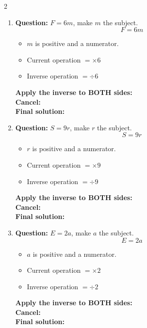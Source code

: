 \documentclass[11pt]{article}
\begin{document}
\begin{multicols}{2}
\begin{enumerate}[leftmargin=*, itemsep=10pt]
\columnbreak
\item \textbf{Question:} \( F = 6m \), make \( m \) the subject.
\[
F=6m
\]
\begin{itemize}[leftmargin=*, itemsep=2pt]
\item \(m\) is positive and a numerator.
\item Current operation \(= \times 6\)
\item Inverse operation \(= \div 6\)
\end{itemize}
\textbf{Apply the inverse to BOTH sides:} \\[1.5cm]
\textbf{Cancel:} \\[1.5cm]
\textbf{Final solution:}\\[1.5cm]

\item \textbf{Question:} \( S = 9r \), make \( r \) the subject.
\[
S=9r
\]
\begin{itemize}[leftmargin=*, itemsep=2pt]
\item \(r\) is positive and a numerator.
\item Current operation \(= \times 9\)
\item Inverse operation \(= \div 9\)
\end{itemize}
\textbf{Apply the inverse to BOTH sides:} \\[1.5cm]
\textbf{Cancel:} \\[1.5cm]
\textbf{Final solution:}\\[1.5cm]

\newpage
\item \textbf{Question:} \( E = 2a \), make \( a \) the subject.
\[
E=2a
\]
\begin{itemize}[leftmargin=*, itemsep=2pt]
\item \(a\) is positive and a numerator.
\item Current operation \(= \times 2\)
\item Inverse operation \(= \div 2\)
\end{itemize}
\textbf{Apply the inverse to BOTH sides:} \\[1.5cm]
\textbf{Cancel:} \\[1.5cm]
\textbf{Final solution:}\\[1.5cm]


\end{enumerate}
\end{multicols}
\end{document}

